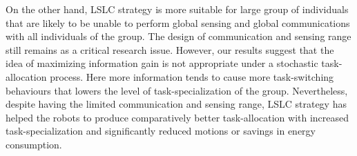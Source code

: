 \documentclass[journal]{IEEEtran}
\begin{document}
On the other hand, LSLC strategy is more suitable for large group of individuals that are likely to be unable to perform global sensing and global communications with all individuals of the group. The design of communication and sensing range still remains as a critical research issue. However, our results suggest that the idea of maximizing information gain is not appropriate under a stochastic task-allocation process. Here more information tends to cause more task-switching behaviours that lowers the level of task-specialization of the group. %
Nevertheless, despite having the limited communication and sensing range, LSLC strategy has helped the robots to produce comparatively better task-allocation with increased task-specialization and significantly reduced motions or savings in energy consumption.
\end{document}
